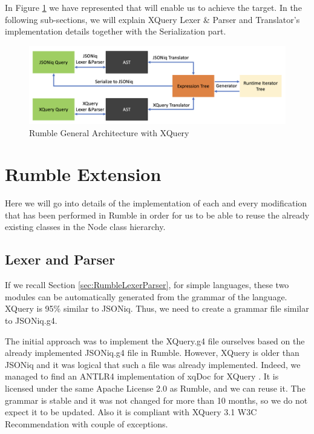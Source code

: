 In Figure \ref{fig:Rumble_General_Architecture_With_XQuery} we have represented that will enable us to achieve the target. In the following sub-sections, we will explain XQuery Lexer \& Parser and Translator's implementation details together with the Serialization part. 

\begin{figure}[h!]
	\includegraphics[width=\linewidth]{double_parsing_architecture.png}
	\vspace*{-5mm}
	\caption{Rumble General Architecture with XQuery}
	\label{fig:Rumble_General_Architecture_With_XQuery}
\end{figure}

\section{Rumble Extension}
Here we will go into details of the implementation of each and every modification that has been performed in Rumble in order for us to be able to reuse the already existing classes in the Node class hierarchy. 

\subsection{Lexer and Parser}
If we recall Section \ref{sec:RumbleLexerParser}, for simple languages, these two modules can be automatically generated from the grammar of the language. XQuery is 95\% similar to JSONiq. Thus, we need to create a grammar file similar to JSONiq.g4. 

The initial approach was to implement the XQuery.g4 file ourselves based on the already implemented JSONiq.g4 file in Rumble. However, XQuery is older than JSONiq and it was logical that such a file was already implemented. Indeed, we managed to find an ANTLR4 implementation of xqDoc for XQuery \cite{XqueryGrammar}. It is licensed under the same Apache License 2.0 as Rumble, and we can reuse it. The grammar is stable and it was not changed for more than 10 months, so we do not expect it to be updated. Also it is compliant with XQuery 3.1 W3C Recommendation \cite{XQueryRecommendation} with couple of exceptions. 

